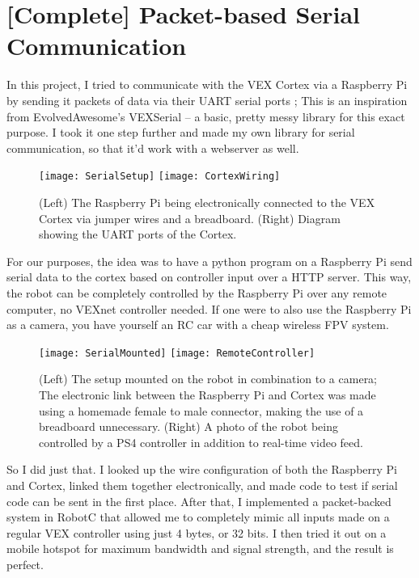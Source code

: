 \section{[Complete] Packet-based Serial Communication}
In this project, I tried to communicate with the VEX Cortex via a Raspberry Pi by sending it packets of data via their UART serial ports \cite{UARTBasic}; This is an inspiration from EvolvedAwesome's VEXSerial \cite{VEXSerial} -- a basic, pretty messy library for this exact purpose. I took it one step further and made my own library for serial communication, so that it'd work with a webserver as well.

\begin{figure}[h]
    \centering
    \texttt{[image: SerialSetup]}
    \texttt{[image: CortexWiring]}
    \caption{
        (Left) The Raspberry Pi being electronically connected to the VEX Cortex via jumper wires and a breadboard. (Right) Diagram showing the UART ports of the Cortex. \cite{CortexWiringCite}
    }
\end{figure}

For our purposes, the idea was to have a python program on a Raspberry Pi send serial data to the cortex based on controller input over a HTTP server. This way, the robot can be completely controlled by the Raspberry Pi over any remote computer, no VEXnet controller needed. If one were to also use the Raspberry Pi as a camera, you have yourself an RC car with a cheap wireless FPV system.

\begin{figure}[h]
    \centering

    \texttt{[image: SerialMounted]}
    \texttt{[image: RemoteController]}
    \caption {
        (Left) The setup mounted on the robot in combination to a camera; The electronic link between the Raspberry Pi and Cortex was made using a homemade female to male connector, making the use of a breadboard unnecessary. (Right) A photo of the robot being controlled by a PS4 controller in addition to real-time video feed.
    }
\end{figure}

So I did just that. I looked up the wire configuration of both the Raspberry Pi and Cortex, linked them together electronically, and made code to test if serial code can be sent in the first place. After that, I implemented a packet-backed system in RobotC that allowed me to completely mimic all inputs made on a regular VEX controller using just 4 bytes, or 32 bits. I then tried it out on a mobile hotspot for maximum bandwidth and signal strength, and the result is perfect.

